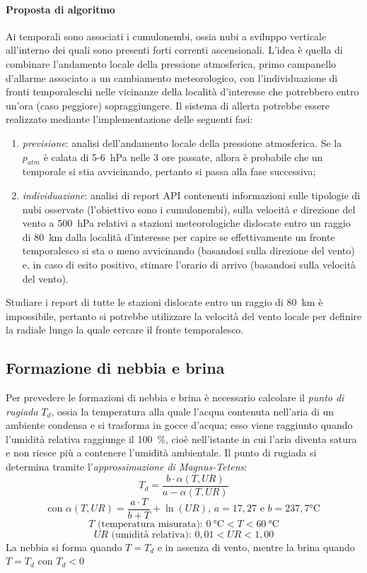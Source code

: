 \paragraph{Proposta di algoritmo} Ai temporali sono associati i cumulonembi, ossia nubi a sviluppo verticale all'interno dei quali sono presenti forti correnti ascensionali. L'idea è quella di combinare l'andamento locale della pressione atmosferica, primo campanello d'allarme associato a un cambiamento meteorologico, con l'individuazione di fronti temporaleschi nelle vicinanze della località d'interesse che potrebbero entro un'ora (caso peggiore) sopraggiungere. Il sistema di allerta potrebbe essere realizzato mediante l'implementazione delle seguenti fasi:
\begin{enumerate}
	\item \textit{previsione}: analisi dell'andamento locale della pressione atmosferica. Se la $p_{atm}$ è calata di 5-\SI{6}{\hecto\pascal} nelle 3 ore passate, allora è probabile che un temporale si stia avvicinando, pertanto si passa alla fase successiva;
	\item \textit{individuazione}: analisi di report API contenenti informazioni sulle tipologie di nubi osservate (l'obiettivo sono i cumulonembi), sulla velocità e direzione del vento a \SI{500}{\hecto\pascal} relativi a stazioni meteorologiche dislocate entro un raggio di \SI{80}{\kilo \meter} dalla località d'interesse per capire se effettivamente un fronte temporalesco si sta o meno avvicinando (basandosi sulla direzione del vento) e, in caso di esito positivo, stimare l'orario di arrivo (basandosi sulla velocità del vento).
\end{enumerate}
Studiare i report di tutte le stazioni dislocate entro un raggio di \SI{80}{\kilo\meter} è impossibile, pertanto si potrebbe utilizzare la velocità del vento locale per definire la radiale lungo la quale cercare il fronte temporalesco.\newline

\subsection{Formazione di nebbia e brina}
Per prevedere le formazioni di nebbia e brina è necessario calcolare il \textit{punto di rugiada} $T_d$, ossia la temperatura alla quale l'acqua contenuta nell'aria di un ambiente condensa e si trasforma in gocce d'acqua; esso viene raggiunto quando l'umidità relativa raggiunge il \SI{100}{\percent}, cioè nell'istante in cui l'aria diventa satura e non riesce più a contenere l'umidità ambientale. Il punto di rugiada si determina tramite l'\textit{approssimazione di Magnus-Tetens}:
\[ T_d = \frac{b \cdot \alpha(T,UR)}{a - \alpha(T,UR)}\]
\[\mbox{con } \alpha(T,UR) = \frac{a \cdot T}{b + T} + \ln(UR) \mbox{, } a = \si{17,27} \mbox{ e } b = \si{237,7}\si{\degreeCelsius}\]
\[T\mbox{ (temperatura misurata): } \SI{0}{\degreeCelsius} < T < \SI{60}{\degreeCelsius}\]
\[UR\mbox{ (umidità relativa): } 0,01 < UR < 1,00\]
La nebbia si forma quando $T = T_d$ e in assenza di vento, mentre la brina quando $T = T_d$ con $T_d < 0$

